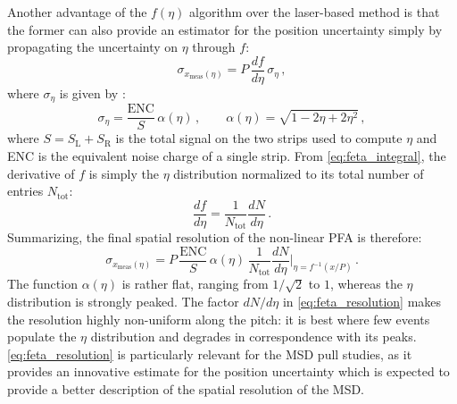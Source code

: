 Another advantage of the $f(\eta)$ algorithm over the laser-based method is that the former can also provide an estimator for the position uncertainty simply by propagating the uncertainty on $\eta$ through $f$:
\begin{equation}
	\sigma_{x_\text{meas}(\eta)} = P\,\frac{df}{d\eta}\,\sigma_\eta\,,
	\label{eq:feta_error_prop}
\end{equation}
where $\sigma_\eta$ is given by \cite{Turchetta:1993vu}:
\begin{equation}
	\sigma_\eta=\frac{\text{ENC}}{S}\,\alpha(\eta)\,,\qquad \alpha(\eta)=\sqrt{1-2\eta+2\eta^2}\,,
	\label{eq:sigma_eta}
\end{equation}
where $S=S_\text{L}+S_\text{R}$ is the total signal on the two strips used to compute $\eta$ and ENC is the equivalent noise charge of a single strip. From \autoref{eq:feta_integral}, the derivative of $f$ is simply the $\eta$ distribution normalized to its total number of entries $N_\text{tot}$:
\begin{equation}
	\frac{df}{d\eta}=\frac{1}{N_\text{tot}}\frac{dN}{d\eta}\,.
	\label{eq:df_deta}
\end{equation}
Summarizing, the final spatial resolution of the non-linear PFA is therefore:
\begin{equation}
	\sigma_{x_\text{meas}(\eta)} = P\,\frac{\text{ENC}}{S}\,\alpha(\eta)\,\frac{1}{N_\text{tot}}\frac{dN}{d\eta}\bigg|_{\eta=f^{-1}(x/P)}\,.
	\label{eq:feta_resolution}
\end{equation}
The function $\alpha(\eta)$ is rather flat, ranging from $1/\sqrt{2}$ to $1$, whereas the $\eta$ distribution is strongly peaked. The factor $dN/d\eta$ in \autoref{eq:feta_resolution} makes the resolution highly non-uniform along the pitch: it is best where few events populate the $\eta$ distribution and degrades in correspondence with its peaks. \autoref{eq:feta_resolution} is particularly relevant for the MSD pull studies, as it provides an innovative estimate for the position uncertainty which is expected to provide a better description of the spatial resolution of the MSD.
